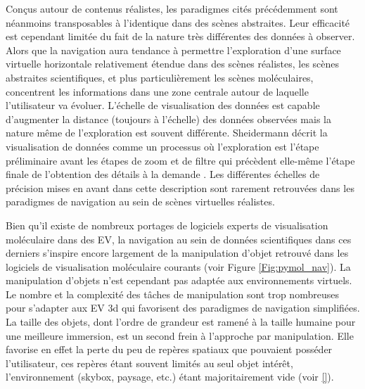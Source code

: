 Conçus autour de contenus réalistes, les paradigmes cités précédemment sont néanmoins transposables à l'identique dans des scènes abstraites. Leur efficacité est cependant limitée du fait de la nature très différentes des données à observer. Alors que la navigation aura tendance à permettre l'exploration d'une surface virtuelle horizontale relativement étendue dans des scènes réalistes, les scènes abstraites scientifiques, et plus particulièrement les scènes moléculaires, concentrent les informations dans une zone centrale autour de laquelle l'utilisateur va évoluer. L'échelle de visualisation des données est capable d'augmenter la distance (toujours à l'échelle) des données observées mais la nature même de l'exploration est souvent différente. Sheidermann décrit la visualisation de données comme un processus où l'exploration est l'étape préliminaire avant les étapes de zoom et de filtre qui précèdent elle-même l'étape finale de l'obtention des détails à la demande \cite{shneiderman_eyes_1996}. Les différentes échelles de précision mises en avant dans cette description sont rarement retrouvées dans les paradigmes de navigation au sein de scènes virtuelles réalistes.

Bien qu'il existe de nombreux portages de logiciels experts de visualisation moléculaire dans des EV, la navigation au sein de données scientifiques dans ces derniers s’inspire encore largement de la manipulation d'objet retrouvé dans les logiciels de visualisation moléculaire courants (voir Figure \ref{Fig:pymol_nav}). La manipulation d'objets n'est cependant pas adaptée aux environnements virtuels. Le nombre et la complexité des tâches de manipulation sont trop nombreuses pour s'adapter aux EV 3d qui favorisent des paradigmes de navigation simplifiées. La taille des objets, dont l'ordre de grandeur est ramené à la taille humaine pour une meilleure immersion, est un second frein à l'approche par manipulation. Elle favorise en effet la perte du peu de repères spatiaux que pouvaient posséder l'utilisateur, ces repères étant souvent limités au seul objet intérêt, l'environnement (skybox, paysage, etc.) étant majoritairement vide (voir \ref{}).   


